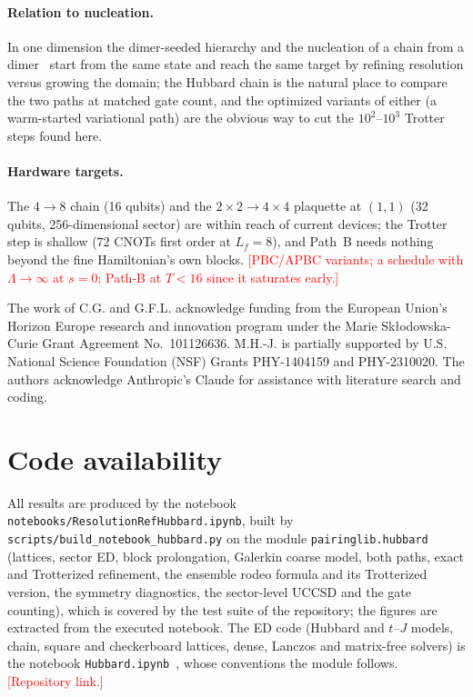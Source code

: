 \documentclass[
  aps,
  prc,
  reprint,
  superscriptaddress,
  floatfix,
  nofootinbib
]{revtex4-2}
\newcommand{\todo}[1]{\textcolor{red}{[#1]}}
\begin{document}
\paragraph{Relation to nucleation.}
In one dimension the dimer-seeded hierarchy and the nucleation of a chain
from a dimer~\cite{Sadia2026} start from the same state and reach the same
target by refining resolution versus growing the domain; the Hubbard chain
is the natural place to compare the two paths at matched gate count, and the
optimized variants of either (a warm-started variational path) are the
obvious way to cut the $10^2$--$10^3$ Trotter steps found here.

\paragraph{Hardware targets.}
The $4\to8$ chain (16 qubits) and the $2\times2\to4\times4$ plaquette at
$(1,1)$ (32 qubits, 256-dimensional sector) are within reach of current
devices; the Trotter step is shallow ($72$ CNOTs first order at $L_f=8$),
and Path~B needs nothing beyond the fine Hamiltonian's own blocks.
\todo{PBC/APBC variants; a schedule with $\Lambda\to\infty$ at $s=0$;
Path-B at $T<16$ since it saturates early.}

\begin{acknowledgments}
The work of C.G. and G.F.L. acknowledge funding from the
European Union's Horizon Europe research and innovation program under the
Marie Sk\l{}odowska-Curie Grant Agreement No.\ 101126636. M.H.-J. is
partially supported by U.S. National Science Foundation (NSF) Grants
PHY-1404159 and PHY-2310020.  The authors acknowledge Anthropic's Claude
for assistance with literature search and coding.
\end{acknowledgments}

\section*{Code availability}
\label{sec:code}
All results are produced by the notebook
\texttt{notebooks/ResolutionRefHubbard.ipynb}, built by
\texttt{scripts/build\_notebook\_hubbard.py} on the module
\texttt{pairinglib.hubbard} (lattices, sector ED, block prolongation,
Galerkin coarse model, both paths, exact and Trotterized refinement, the
ensemble rodeo formula and its Trotterized version, the symmetry
diagnostics, the sector-level UCCSD and the gate counting), which is covered
by the test suite of the repository; the figures are extracted from the
executed notebook.  The ED code (Hubbard and $t$--$J$ models, chain, square
and checkerboard lattices, dense, Lanczos and matrix-free solvers) is the
notebook \texttt{Hubbard.ipynb}~\cite{HubbardNotebook}, whose conventions
the module follows.  \todo{Repository link.}
\end{document}
